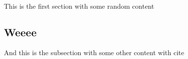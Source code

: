 This is the first section with some random content

\subsection{Weeee}
And this is the subsection with some other content with cite \cite{einstein}